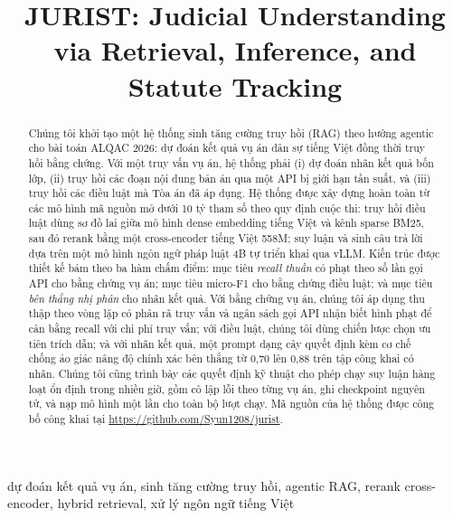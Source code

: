 \documentclass[conference]{IEEEtran}
\begin{document}
\title{JURIST: Judicial Understanding via Retrieval, Inference, and Statute Tracking}

\author{
}

\maketitle

\begin{abstract}
  Chúng tôi khởi tạo một hệ thống sinh tăng cường truy hồi (RAG) theo hướng agentic cho bài toán ALQAC 2026: dự đoán kết quả vụ án dân sự tiếng Việt đồng thời truy hồi bằng chứng. Với một truy vấn vụ án, hệ thống phải (i) dự đoán nhãn kết quả bốn lớp, (ii) truy hồi các đoạn nội dung bản án qua một API bị giới hạn tần suất, và (iii) truy hồi các điều luật mà Tòa án đã áp dụng.
  Hệ thống được xây dựng hoàn toàn từ các mô hình mã nguồn mở dưới 10 tỷ tham số theo quy định cuộc thi: truy hồi điều luật dùng sơ đồ lai giữa mô hình dense embedding tiếng Việt và kênh sparse BM25, sau đó rerank bằng một cross-encoder tiếng Việt 558M; suy luận và sinh câu trả lời dựa trên một mô hình ngôn ngữ pháp luật 4B tự triển khai qua vLLM. Kiến trúc được thiết kế bám theo ba hàm chấm điểm: mục tiêu \emph{recall thuần} có phạt theo số lần gọi API cho bằng chứng vụ án; mục tiêu micro-F1 cho bằng chứng điều luật; và mục tiêu \emph{bên thắng nhị phân} cho nhãn kết quả. Với bằng chứng vụ án, chúng tôi áp dụng thu thập theo vòng lặp có phân rã truy vấn và ngân sách gọi API nhận biết hình phạt để cân bằng recall với chi phí truy vấn; với điều luật, chúng tôi dùng chiến lược chọn ưu tiên trích dẫn; và với nhãn kết quả, một prompt dạng cây quyết định kèm cơ chế chống ảo giác nâng độ chính xác bên thắng từ 0,70 lên 0,88 trên tập công khai có nhãn. Chúng tôi cũng trình bày các quyết định kỹ thuật cho phép chạy suy luận hàng loạt ổn định trong nhiều giờ, gồm cô lập lỗi theo từng vụ án, ghi checkpoint nguyên tử, và nạp mô hình một lần cho toàn bộ lượt chạy. Mã nguồn của hệ thống được công bố công khai tại \url{https://github.com/Syun1208/jurist}.
\end{abstract}

\begin{IEEEkeywords}
  dự đoán kết quả vụ án, sinh tăng cường truy hồi, agentic RAG, rerank cross-encoder, hybrid retrieval, xử lý ngôn ngữ tiếng Việt
\end{IEEEkeywords}
\end{document}
